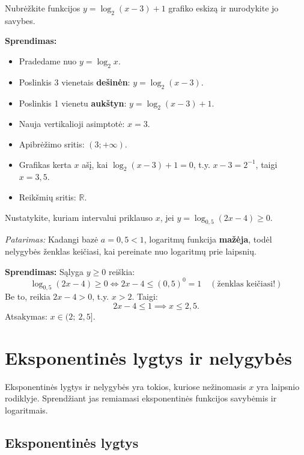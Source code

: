\begin{example}
Nubrėžkite funkcijos $y = \log_2(x - 3) + 1$ grafiko eskizą ir nurodykite jo savybes.

\textbf{Sprendimas:}
\begin{itemize}
  \item Pradedame nuo $y = \log_2 x$.
  \item Poslinkis 3 vienetais \textbf{dešinėn}: $y = \log_2(x-3)$.
  \item Poslinkis 1 vienetu \textbf{aukštyn}: $y = \log_2(x-3) + 1$.
  \item Nauja vertikalioji asimptotė: $x = 3$.
  \item Apibrėžimo sritis: $(3; +\infty)$.
  \item Grafikas kerta $x$ ašį, kai $\log_2(x-3)+1 = 0$, t.y. $x - 3 = 2^{-1}$, taigi $x = 3{,}5$.
  \item Reikšmių sritis: $\mathbb{R}$.
\end{itemize}
\end{example}

\begin{exercise}
Nustatykite, kuriam intervalui priklauso $x$, jei $y = \log_{0{,}5}(2x - 4) \geq 0$.

\textit{Patarimas:} Kadangi bazė $a = 0{,}5 < 1$, logaritmų funkcija \textbf{mažėja}, todėl nelygybės ženklas keičiasi, kai pereinate nuo logaritmų prie laipsnių.

\textbf{Sprendimas:}
Sąlyga $y \geq 0$ reiškia:
\[
  \log_{0{,}5}(2x-4) \geq 0 \iff 2x-4 \leq (0{,}5)^0 = 1 \quad (\text{ženklas keičiasi!})
\]
Be to, reikia $2x - 4 > 0$, t.y. $x > 2$. Taigi:
\[
  2x - 4 \leq 1 \implies x \leq 2{,}5.
\]
Atsakymas: $x \in (2;\ 2{,}5]$.
\end{exercise}


\section{Eksponentinės lygtys ir nelygybės}

Eksponentinės lygtys ir nelygybės yra tokios, kuriose nežinomasis $x$ yra laipsnio rodiklyje.
Sprendžiant jas remiamasi eksponentinės funkcijos savybėmis ir logaritmais.

\subsection{Eksponentinės lygtys}

